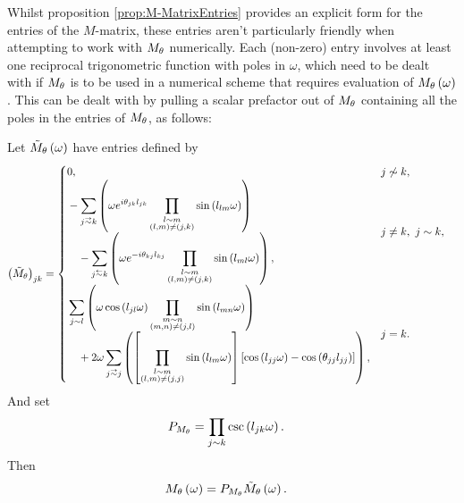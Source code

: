 Whilst proposition \ref{prop:M-MatrixEntries} provides an explicit form for the entries of the $M$-matrix, these entries aren't particularly friendly when attempting to work with $M_\theta$ numerically.
Each (non-zero) entry involves at least one reciprocal trigonometric function with poles in $\omega$, which need to be dealt with if $M_\theta$ is to be used in a numerical scheme that requires evaluation of $M_\theta\left( \omega \right)$.
This can be dealt with by pulling a scalar prefactor out of $M_\theta$ containing all the poles in the entries of $M_\theta$, as follows:
\begin{cory} \label{cory:M-MatrixEntriesNoPoles}
	Let $\tilde{M}_\theta\left( \omega \right)$ have entries defined by
	\begin{align*}
		\bracs{\tilde{M}_\qm}_{jk} &= 
		\begin{cases}
			\!\begin{aligned}
				&0,
			\end{aligned}			
			& j \not\con k, \\
			\!\begin{aligned}
				&-\sum_{j\conLeft k} \bracs{ \omega e^{i\qm_{jk}l_{jk}} \prod_{\substack{ l\con m \\ \bracs{l,m} \neq \bracs{j,k} }}\sin\bracs{l_{lm}\omega} }
				\\ &\quad - \sum_{j\conRight k} \bracs{ \omega e^{-i\qm_{kj}l_{kj}} \prod_{\substack{l\con m \\ \bracs{l,m} \neq \bracs{j,k} }}\sin\bracs{l_{ml}\omega} },
			\end{aligned}
			& j\neq k, \ j\con k, \\
			\!\begin{aligned}
				&\sum_{j\con l} \bracs{ \omega\cos\bracs{l_{jl}\omega}\prod_{\substack{ m\con n \\ \bracs{m,n}\neq\bracs{j,l} }}\sin\bracs{l_{mn}\omega} }
				\\ &\quad + 2\omega\sum_{j\conLeft j} \bracs{ \sqbracs{ \prod_{\substack{l\con m \\ \bracs{l,m}\neq\bracs{j,j} }}\sin\bracs{l_{lm}\omega} }\sqbracs{ \cos\bracs{l_{jj}\omega} - \cos\bracs{\qm_{jj}l_{jj}} } },
			\end{aligned}
			& j=k.
		\end{cases}
	\end{align*}
	And set
	\begin{align*}
		P_{M_\theta} &= \prod_{j\sim k}\csc\left( l_{jk}\omega \right).
	\end{align*}
	Then
	\begin{align*}
		M_\theta\left( \omega \right) &= P_{M_\theta}\tilde{M}_\theta\left( \omega \right).
	\end{align*}
\end{cory}
